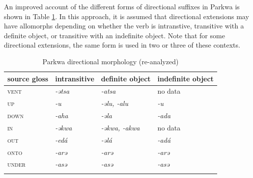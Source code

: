
An improved account of the different forms of directional suffixes in Parkwa is shown in Table \ref{tab:park2}. In this approach, it is assumed that directional extensions may have allomorphs depending on whether the verb is intranstive, transitive with a definite object, or transitive with an indefinite object. Note that for some directional extensions, the same form is used in two or three of these contexts. 

\begin{table}
	\caption{Parkwa directional morphology (re-analyzed)}
	\label{tab:park2}
	\begin{tabular}{llll} %
		\lsptoprule
		source gloss & intransitive  & definite object & indefinite object \\ %
		\midrule
		\textsc{vent}  &	\textit{-ətsa}  &  	\textit{-atsa}  & no data  \\
		{\textsc{up}}  & \textit{-u}  &  \textit{-əlu, -alu} & \textit{-u} \\
		{\textsc{down}}  &    \textit{-aha} &  \textit{-əla} & \textit{-ada} \\
		{\textsc{in}}  &   	\textit{-əkwa}  &  	\textit{-əkwa, -akwa} & no data \\
		{\textsc{out}} & \textit{-edá} &   \textit{-əlá} & \textit{-adá}  \\
		{\textsc{onto}} & \textit{-arə} &  \textit{-arə}  & \textit{-arə}   \\
		{\textsc{under}} & \textit{-asə} &  \textit{-asə} &  \textit{-asə}   \\
		\lspbottomrule
	\end{tabular}
\end{table} 

